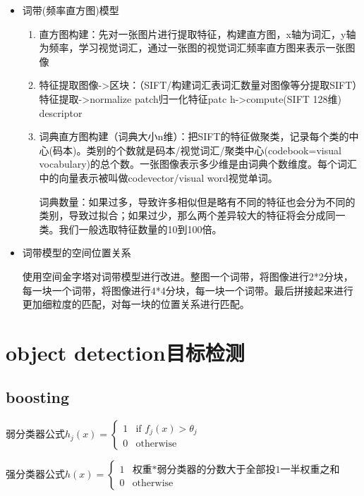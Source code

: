 \documentclass[UTF8]{ctexart}
\begin{document}
\begin{itemize}
    \item 词带(频率直方图)模型
    \begin{enumerate}
        \item 直方图构建：先对一张图片进行提取特征，构建直方图，x轴为词汇，y轴为频率，学习视觉词汇，通过一张图的视觉词汇频率直方图来表示一张图像
        \item 特征提取图像->区块：（SIFT/构建词汇表词汇数量对图像等分提取SIFT）特征提取->normalize patch归一化特征patc h->compute(SIFT 128维) descriptor
        \item 词典直方图构建（词典大小n维）：把SIFT的特征做聚类，记录每个类的中心(码本)。类别的个数就是码本/视觉词汇/聚类中心(codebook=visual vocabulary)的总个数。一张图像表示多少维是由词典个数维度。每个词汇中的向量表示被叫做codevector/visual word视觉单词。
        
        词典数量：如果过多，导致许多相似但是略有不同的特征也会分为不同的类别，导致过拟合；如果过少，那么两个差异较大的特征将会分成同一类。我们一般选取特征数量的10到100倍。
        
    \end{enumerate}
    \item 词带模型的空间位置关系
    
    使用空间金字塔对词带模型进行改进。整图一个词带，将图像进行2*2分块，每一块一个词带，将图像进行4*4分块，每一块一个词带。最后拼接起来进行更加细粒度的匹配，对每一块的位置关系进行匹配。
    
\end{itemize}

\section{object detection目标检测}

\subsection{boosting}

弱分类器公式$h_j(x) = \begin{cases} 1 & \text{if } f_j(x) > \theta_j \\ 0 & \text{otherwise} \end{cases}$

强分类器公式$h(x) = \begin{cases} 1 & \text{权重*弱分类器的分数大于全部投1一半权重之和} \\ 0 & \text{otherwise} \end{cases}$
\end{document}

